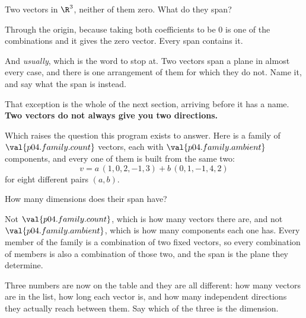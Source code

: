 
\begin{fr}
Two vectors in $\R^{3}$, neither of them zero. What do they span?
\nextframe
\end{fr}

\begin{fr}
Through the origin, because taking both coefficients to be $0$ is one of the
combinations and it gives the zero vector. Every span contains it.

And \emph{usually}, which is the word to stop at. Two vectors span a plane in
almost every case, and there is one arrangement of them for which they do not.
Name it, and say what the span is instead.
\dotline
\nextframe
\end{fr}

\begin{fr}

That exception is the whole of the next section, arriving before it has a name.
\textbf{Two vectors do not always give you two directions.}

Which raises the question this program exists to answer. Here is a family of
$\val{p04.family.count}$ vectors, each with $\val{p04.family.ambient}$
components, and every one of them is built from the same two:
\[ v = a\,(1, 0, 2, -1, 3) + b\,(0, 1, -1, 4, 2) \]
for eight different pairs $(a, b)$.

How many dimensions does their span have?
\nextframe
\end{fr}

\begin{fr}
Not $\val{p04.family.count}$, which is how many vectors there are, and not
$\val{p04.family.ambient}$, which is how many components each one has. Every
member of the family is a combination of two fixed vectors, so every
combination of members is also a combination of those two, and the span is the
plane they determine.

Three numbers are now on the table and they are all different: how many
vectors are in the list, how long each vector is, and how many independent
directions they actually reach between them. Say which of the three is the
dimension.
\dotline
\nextframe
\end{fr}

